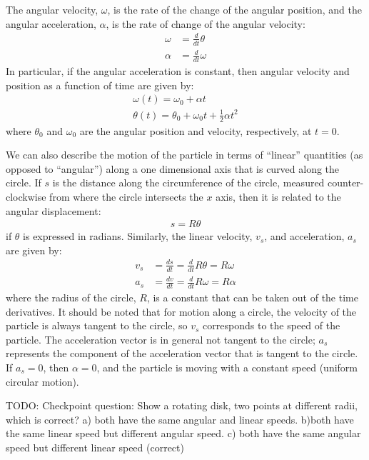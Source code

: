 The angular velocity, $\omega$, is the rate of the change of the angular position, and the angular acceleration, $\alpha$, is the rate of change of the angular velocity:
\begin{align*}
\omega &= \frac{d}{dt}\theta \\
\alpha &= \frac{d}{dt}\omega
\end{align*}
In particular, if the angular acceleration is constant, then angular velocity and position as a function of time are given by:
\begin{align*}
\omega(t) = \omega_0+\alpha t\\
\theta(t) = \theta_0+\omega_0 t+\frac{1}{2}\alpha t^2
\end{align*}
where $\theta_0$ and $\omega_0$ are the angular position and velocity, respectively, at $t=0$.

We can also describe the motion of the particle in terms of ``linear'' quantities (as opposed to ``angular'') along a one dimensional axis that is curved along the circle. If $s$ is the distance along the circumference of the circle, measured counter-clockwise from where the circle intersects the $x$ axis, then it is related to the angular displacement:
\begin{align*}
s = R\theta
\end{align*}
if $\theta$ is expressed in radians. Similarly, the linear velocity, $v_s$, and acceleration, $a_s$ are given by:
\begin{align*}
v_s &= \frac{ds}{dt} =\frac{d}{dt}R\theta = R\omega\\
a_s&= \frac{dv}{dt} =\frac{d}{dt}R\omega = R\alpha
\end{align*}
where the radius of the circle, $R$, is a constant that can be taken out of the time derivatives. It should be noted that for motion along a circle, the velocity of the particle is always tangent to the circle, so $v_s$ corresponds to the speed of the particle. The acceleration vector is in general not tangent to the circle; $a_s$ represents the component of the acceleration vector that is tangent to the circle. If $a_s=0$, then $\alpha=0$, and the particle is moving with a constant speed (uniform circular motion).

TODO: Checkpoint question: Show a rotating disk, two points at different radii, which is correct? a) both have the same angular and linear speeds. b)both have the same linear speed but different angular speed. c) both have the same angular speed but different linear speed (correct)


